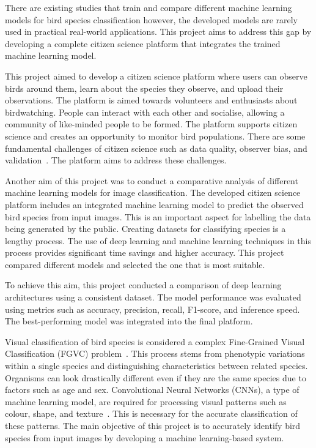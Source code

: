 There are existing studies that train and compare different machine learning models 
for bird species classification \cite{bilgin2022bird,tang2025comparative} however, the developed models are rarely
used in practical real-world applications. This project aims to address this gap by developing 
a complete citizen science platform that integrates the trained machine learning model.

This project aimed to develop a citizen science platform where users can observe
birds around them, learn about the species they observe, and upload their observations.
The platform is aimed towards volunteers and enthusiasts about birdwatching. People can
interact with each other and socialise, allowing a community of like-minded people to be
formed. The platform supports citizen science and creates an opportunity to monitor
bird populations. There are some fundamental challenges of citizen science such as data
quality, observer bias, and validation~\cite{johnston2022outstanding}. The platform aims
to address these challenges.

Another aim of this project was to conduct a comparative analysis of different machine
learning models for image classification. The developed citizen science platform includes an integrated machine learning model to predict the observed bird species from input
images. This is an important aspect for labelling the data being generated by the public.
Creating datasets for classifying species is a lengthy process. The use of deep learning and
machine learning techniques in this process provides significant time savings and higher
accuracy. This project compared different models and selected the one that is most
suitable.

To achieve this aim, this project conducted a comparison of deep learning architectures
using a consistent dataset. The model performance was evaluated using metrics such as accuracy, precision, recall, F1-score, and inference speed. The best-performing model was integrated into the final platform.

Visual classification of bird species is considered a complex Fine-Grained Visual
Classification (FGVC) problem~\cite{chen2024fetfgvc}. This process stems from
phenotypic variations within a single species and distinguishing characteristics between
related species. Organisms can look drastically different even if they are the same species
due to factors such as age and sex. Convolutional Neural Networks (CNNs), a type of
machine learning model, are required for processing visual patterns such as colour, shape,
and texture~\cite{lolge2025evolution}. This is necessary for the accurate classification of
these patterns. The main objective of this project is to accurately identify bird species
from input images by developing a machine learning-based system.

